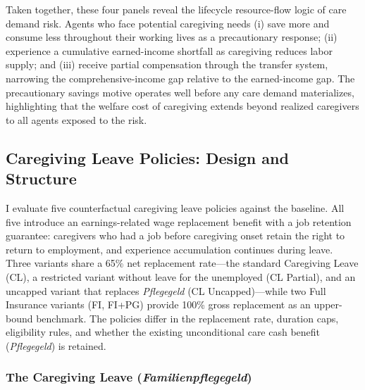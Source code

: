 Taken together, these four panels reveal the lifecycle resource-flow logic of care demand risk. Agents who face potential caregiving needs (i) save more and consume less throughout their working lives as a precautionary response; (ii) experience a cumulative earned-income shortfall as caregiving reduces labor supply; and (iii) receive partial compensation through the transfer system, narrowing the comprehensive-income gap relative to the earned-income gap. The precautionary savings motive operates well before any care demand materializes, highlighting that the welfare cost of caregiving extends beyond realized caregivers to all agents exposed to the risk.

\subsection{Caregiving Leave Policies: Design and Structure}
\label{subsec:policy_design}

I evaluate five counterfactual caregiving leave policies against the baseline. All five introduce an earnings-related wage replacement benefit with a job retention guarantee: caregivers who had a job before caregiving onset retain the right to return to employment, and experience accumulation continues during leave. Three variants share a 65\% net replacement rate---the standard Caregiving Leave (CL), a restricted variant without leave for the unemployed (CL Partial), and an uncapped variant that replaces \textit{Pflegegeld} (CL Uncapped)---while two Full Insurance variants (FI, FI+PG) provide 100\% gross replacement as an upper-bound benchmark. The policies differ in the replacement rate, duration caps, eligibility rules, and whether the existing unconditional care cash benefit (\textit{Pflegegeld}) is retained.

\subsubsection{The Caregiving Leave (\textit{Familienpflegegeld})}

